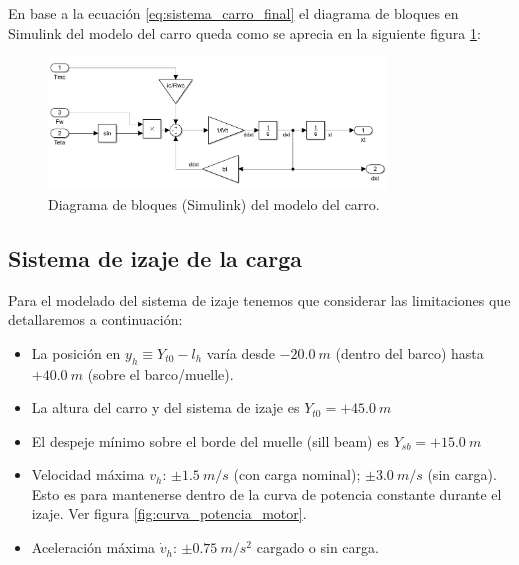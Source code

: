 \documentclass[11pt]{article}
\begin{document}
En base a la ecuación \ref{eq:sistema_carro_final} el diagrama de bloques en Simulink del modelo del carro queda como se aprecia en la siguiente figura \ref{fig:sistema_carro_simulink}:

\begin{figure}[h!]
	\centering
	\includegraphics[width=0.8\textwidth]{images/imagen_3_simulink_carro.png}
	\caption{Diagrama de bloques (Simulink) del modelo del carro.}
	\label{fig:sistema_carro_simulink}
\end{figure}

\newpage

\subsection{Sistema de izaje de la carga}

Para el modelado del sistema de izaje tenemos que considerar las limitaciones que detallaremos a continuación:
\begin{itemize}
	\item La posición en $y_{h}\equiv Y_{t0}-l_{h}$ varía desde $-20.0\ m$ (dentro del barco) hasta $+40.0\ m$ (sobre el barco/muelle).
	\item La altura del carro y del sistema de izaje es $Y_{t0}= +45.0\ m$
	\item El despeje mínimo sobre el borde del muelle (sill beam) es $Y_{sb}= +15.0\ m$
	\item Velocidad máxima $v_{h}$: $\pm 1.5\ m/s$ (con carga nominal); $\pm 3.0\ m/s$ (sin carga). Esto es para mantenerse dentro de la curva de potencia constante durante el izaje. Ver figura \ref{fig:curva_potencia_motor}.
	\item Aceleración máxima $\dot{v}_{h}$: $\pm 0.75\ m/s^{2}$ cargado o sin carga.
\end{itemize}
\end{document}
